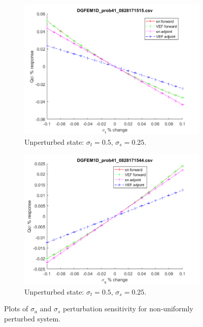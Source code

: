 \documentclass[12pt]{report}
\newcommand{\sigt}{\sigma_t}
\newcommand{\sigs}{\sigma_s}
\newcommand{\siga}{\sigma_a}
\begin{document}
\begin{figure}[H]
\begin{subfigure}{.5\textwidth}
  \centering
  \includegraphics[width=.98\linewidth]{figures/41sigtSens.png}
  \caption{Unperturbed state: $\sigt=0.5$, $\sigs=0.25$.}
  \label{fig:sfig3}
\end{subfigure}%
\begin{subfigure}{.5\textwidth}
  \centering
  \includegraphics[width=.98\linewidth]{figures/41sigsSens.png}
  \caption{Unperturbed state: $\sigt=0.5$, $\sigs=0.25$.}
  \label{fig:sfig6}
\end{subfigure}%
\caption{Plots of $\siga$ and $\sigs$ perturbation sensitivity for non-uniformly perturbed system.}
\label{fig:fig}
\end{figure}
\end{document}
